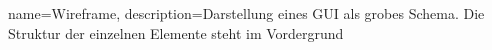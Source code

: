 
{
  name=Wireframe,
  description={Darstellung eines \ac{GUI} als grobes Schema. Die Struktur der einzelnen Elemente steht im Vordergrund}
}